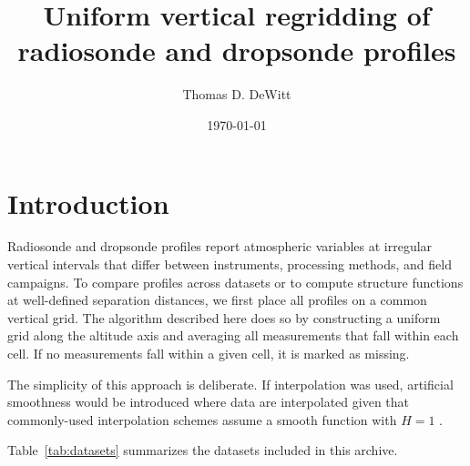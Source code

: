 \documentclass[11pt]{article}
\title{Uniform vertical regridding of radiosonde and dropsonde profiles}
\author{Thomas D. DeWitt}
\date{\today}
\begin{document}
\maketitle

\section{Introduction}

Radiosonde and dropsonde profiles report atmospheric variables at irregular vertical intervals that differ between instruments, processing methods, and field campaigns.  To compare profiles across datasets or to compute structure functions at well-defined separation distances, we first place all profiles on a common vertical grid.  The algorithm described here does so by constructing a uniform grid along the altitude axis and averaging all measurements that fall within each cell. If no measurements fall within a given cell, it is marked as missing.

The simplicity of this approach is deliberate. If interpolation was used, artificial smoothness would be introduced where data are interpolated given that commonly-used interpolation schemes assume a smooth function with $H=1$ \citep[cf.][]{lovejoy2007}.

Table~\ref{tab:datasets} summarizes the datasets included in this archive.
\end{document}
